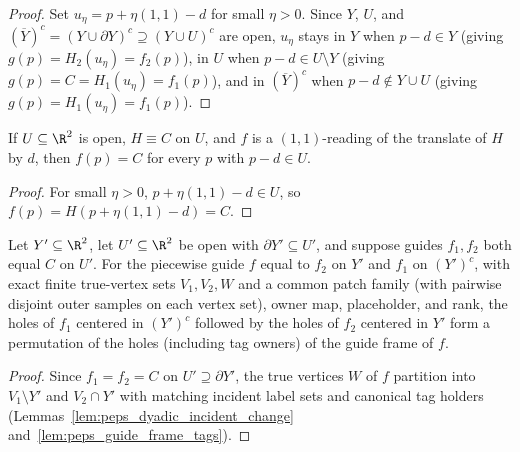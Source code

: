\begin{proof}\leanok
    Set $u_\eta=p+\eta(1,1)-d$ for small $\eta>0$. Since $Y$, $U$, and $(\overline Y)^c=(Y\cup\partial Y)^c\supseteq(Y\cup U)^c$ are open, $u_\eta$ stays in $Y$ when $p-d\in Y$ (giving $g(p)=H_2(u_\eta)=f_2(p)$), in $U$ when $p-d\in U\setminus Y$ (giving $g(p)=C=H_1(u_\eta)=f_1(p)$), and in $(\overline Y)^c$ when $p-d\notin Y\cup U$ (giving $g(p)=H_1(u_\eta)=f_1(p)$).
\end{proof}

\begin{lemma}
    \label{thm:peps_reading_constant_open}
    \leanok
    If $U\subseteq\R^2$ is open, $H\equiv C$ on $U$, and $f$ is a $(1,1)$-reading of the translate of $H$ by $d$, then $f(p)=C$ for every $p$ with $p-d\in U$.
\end{lemma}

\begin{proof}\leanok
    For small $\eta>0$, $p+\eta(1,1)-d\in U$, so $f(p)=H(p+\eta(1,1)-d)=C$.
\end{proof}

\begin{lemma}
    \label{thm:peps_exchange_holes_perm}
    \leanok
    Let $Y'\subseteq\R^2$, let $U'\subseteq\R^2$ be open with $\partial Y'\subseteq U'$, and suppose guides $f_1,f_2$ both equal $C$ on $U'$. For the piecewise guide $f$ equal to $f_2$ on $Y'$ and $f_1$ on $(Y')^c$, with exact finite true-vertex sets $V_1,V_2,W$ and a common patch family (with pairwise disjoint outer samples on each vertex set), owner map, placeholder, and rank, the holes of $f_1$ centered in $(Y')^c$ followed by the holes of $f_2$ centered in $Y'$ form a permutation of the holes (including tag owners) of the guide frame of $f$.
\end{lemma}

\begin{proof}\leanok
    Since $f_1=f_2=C$ on $U'\supseteq\partial Y'$, the true vertices $W$ of $f$ partition into $V_1\setminus Y'$ and $V_2\cap Y'$ with matching incident label sets and canonical tag holders (Lemmas~\ref{lem:peps_dyadic_incident_change} and~\ref{lem:peps_guide_frame_tags}).
\end{proof}

